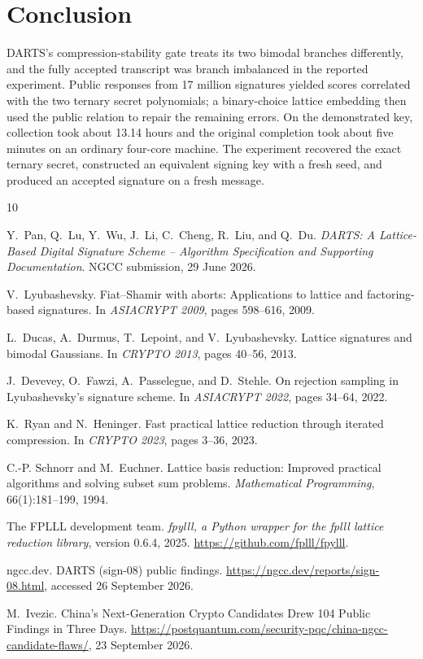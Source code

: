 \documentclass[11pt,a4paper]{article}
\begin{document}
\section{Conclusion}

DARTS's compression-stability gate treats its two bimodal branches
differently, and the fully accepted transcript was branch imbalanced in the
reported experiment.  Public responses from 17 million signatures yielded
scores correlated with the two ternary secret polynomials; a binary-choice
lattice embedding then used the public relation to repair the remaining
errors.  On the demonstrated key, collection took about 13.14 hours and the
original completion took about five minutes on an ordinary four-core machine.
The experiment recovered the exact ternary secret, constructed an equivalent
signing key with a fresh seed, and produced an accepted signature on a fresh
message.

\begin{thebibliography}{10}

Y.~Pan, Q.~Lu, Y.~Wu, J.~Li, C.~Cheng, R.~Liu, and Q.~Du.
\newblock \emph{DARTS: A Lattice-Based Digital Signature Scheme -- Algorithm
  Specification and Supporting Documentation}.
\newblock NGCC submission, 29 June 2026.

V.~Lyubashevsky.
\newblock Fiat--Shamir with aborts: Applications to lattice and
  factoring-based signatures.
\newblock In \emph{ASIACRYPT 2009}, pages 598--616, 2009.

L.~Ducas, A.~Durmus, T.~Lepoint, and V.~Lyubashevsky.
\newblock Lattice signatures and bimodal Gaussians.
\newblock In \emph{CRYPTO 2013}, pages 40--56, 2013.

J.~Devevey, O.~Fawzi, A.~Passelegue, and D.~Stehle.
\newblock On rejection sampling in Lyubashevsky's signature scheme.
\newblock In \emph{ASIACRYPT 2022}, pages 34--64, 2022.

K.~Ryan and N.~Heninger.
\newblock Fast practical lattice reduction through iterated compression.
\newblock In \emph{CRYPTO 2023}, pages 3--36, 2023.

C.-P. Schnorr and M.~Euchner.
\newblock Lattice basis reduction: Improved practical algorithms and solving
  subset sum problems.
\newblock \emph{Mathematical Programming}, 66(1):181--199, 1994.

The FPLLL development team.
\newblock \emph{fpylll, a Python wrapper for the fplll lattice reduction
  library}, version 0.6.4, 2025.
\newblock \url{https://github.com/fplll/fpylll}.

ngcc.dev.
\newblock DARTS (sign-08) public findings.
\newblock \url{https://ngcc.dev/reports/sign-08.html}, accessed 26 September
  2026.

M.~Ivezic.
\newblock China's Next-Generation Crypto Candidates Drew 104 Public Findings
  in Three Days.
\newblock \url{https://postquantum.com/security-pqc/china-ngcc-candidate-flaws/},
  23 September 2026.

\end{thebibliography}
\end{document}
